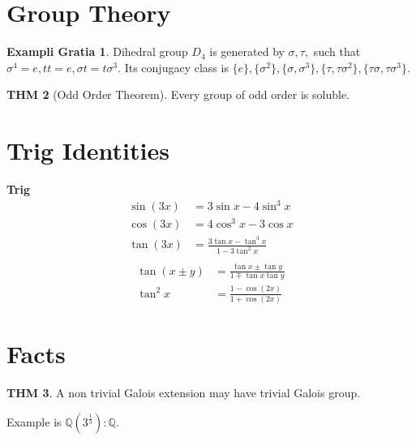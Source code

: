 \documentclass[twocolumn]{article}
\newcommand\blankpage{%
    \null
    \thispagestyle{empty}%
    \addtocounter{page}{-1}%
    \newpage}
\newcommand{\Q}{\mathbb{Q}}
\theoremstyle{definition}
\newtheorem{thm}{THM}
\newtheorem{example}[thm]{Exampli Gratia}
\theoremstyle{remark}
\begin{document}
\section{Group Theory}

\begin{example}
	Dihedral group $D_4$ is generated by $\sigma, \tau,$ such that $\sigma^4 = e , tt = e, \sigma t = t \sigma^3$. 
	Its conjugacy class is $\{e\}, \{\sigma^2\}, \{\sigma, \sigma^3\}, \{\tau, \tau \sigma^2\}, \{\tau \sigma, \tau \sigma^3\}$.
\end{example}

\begin{thm}[Odd Order Theorem]
	Every group of odd order is soluble.	
\end{thm}

\section{Trig Identities}

\textbf{Trig}
\begin{align}
	\sin(3x) &= 3 \sin x - 4 \sin^3 x \\
	\cos(3x) &= 4 \cos^3 x - 3 \cos x \\ 
	\tan(3x) &= \frac{3 \tan x - \tan^3 x}{1 - 3 \tan^2 x} \\
\end{align}
\begin{align*}
\tan(x \pm y) &= \frac{\tan x \pm \tan y}{1 \mp \tan x \tan y}\\
\tan^2 x &= \frac{1 - \cos(2x)}{1 + \cos(2x)}
\end{align*}

\section{Facts}

\begin{thm}
	A non trivial Galois extension may have trivial Galois group.

	Example is $\Q(3^{\frac{1}{3}}):\Q$.
\end{thm}

\afterpage{\blankpage}
\end{document}
